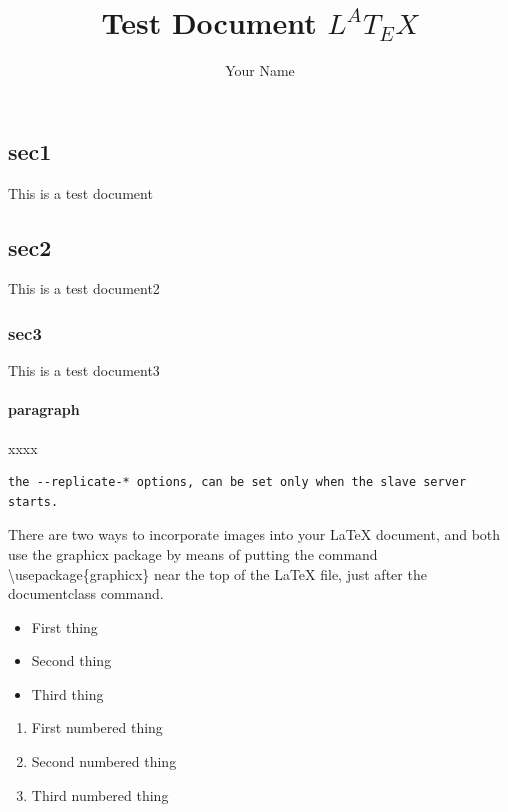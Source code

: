 \documentclass{ctexart}
\author{Your Name}
\title{Test Document $L^AT_EX$}
\begin{document}
\begin{CJK*}{GBK}{song}


\maketitle

\section{sec1}
This is a test document
\subsection{sec2}
This is a test document2
\subsubsection{sec3}
This is a test document3
\paragraph{paragraph}
xxxx


\begin{Sbox}
\begin{minipage}{\textwidth}
\begin{verbatim}
the --replicate-* options, can be set only when the slave server starts.
\end{verbatim}
\end{minipage}
\end{Sbox}
\fbox{\TheSbox}

\parbox{17em}{There are two ways to incorporate images into your LaTeX document, and both use the graphicx package by means of putting the command \textbackslash usepackage\{graphicx\} near the top of the LaTeX file, just after the documentclass command.}

\begin{itemize}
\item First thing
\item Second thing
\item Third thing
\end{itemize}

\begin{enumerate}
\item First numbered thing
\item Second numbered thing
\item Third numbered thing
\end{enumerate}


\end{CJK*}
\end{document}
